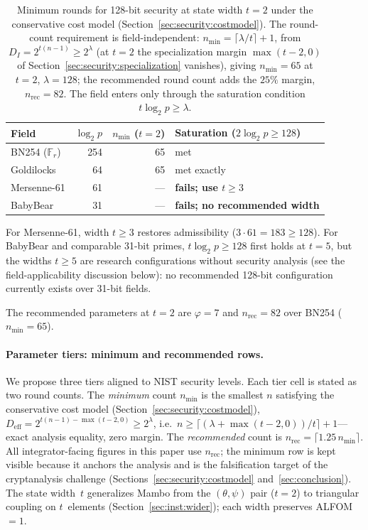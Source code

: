 \documentclass[11pt,a4paper]{article}
\theoremstyle{definition}
\newcommand{\F}{\mathbb{F}}
\begin{document}
\begin{table}[h]
\centering
\caption{Minimum rounds for 128-bit security at state width $t=2$
under the conservative cost model
(Section~\ref{sec:security:costmodel}). The round-count requirement
is field-independent: $n_{\min} = \lceil \lambda/t \rceil + 1$, from
$D_I = 2^{t(n-1)} \ge 2^{\lambda}$ (at $t = 2$ the specialization
margin $\max(t-2,0)$ of Section~\ref{sec:security:specialization}
vanishes), giving $n_{\min} = 65$ at
$t = 2$, $\lambda = 128$; the recommended round count adds the
$25\%$ margin, $n_{\mathrm{rec}} = 82$. The field enters only
through the saturation condition $t \log_2 p \ge \lambda$.}
\label{tab:nmin_t2}
\begin{tabular}{@{}lrrl@{}}
\toprule
Field & $\log_2 p$ & $n_{\min}$ ($t{=}2$) & Saturation ($2\log_2 p \ge 128$) \\
\midrule
BN254 ($\F_r$) & 254 & 65 & met \\
Goldilocks     &  64 & 65 & met exactly \\
Mersenne-61    &  61 & --- & \textbf{fails; use $t \ge 3$} \\
BabyBear       &  31 & --- & \textbf{fails; no recommended width} \\
\bottomrule
\end{tabular}
\smallskip

\footnotesize
For Mersenne-61, width $t \ge 3$ restores admissibility
($3 \cdot 61 = 183 \ge 128$). For BabyBear and comparable 31-bit
primes, $t \log_2 p \ge 128$ first holds at $t = 5$, but the widths
$t \ge 5$ are research configurations without security analysis (see
the field-applicability discussion below): no recommended 128-bit
configuration currently exists over 31-bit fields.
\end{table}

The recommended parameters at $t = 2$ are $\varphi = 7$ and
$n_{\mathrm{rec}} = 82$ over BN254 ($n_{\min} = 65$).

\paragraph{Parameter tiers: minimum and recommended rows.}
We propose three tiers aligned to NIST security levels. Each tier
cell is stated as two round counts. The \emph{minimum} count
$n_{\min}$ is the smallest $n$ satisfying the conservative cost model
(Section~\ref{sec:security:costmodel}),
$D_{\mathrm{eff}} = 2^{t(n-1)-\max(t-2,0)} \ge 2^{\lambda}$, i.e.\
$n \ge \lceil (\lambda + \max(t-2,0))/t \rceil + 1$---exact analysis
equality, zero margin. The \emph{recommended} count is
$n_{\mathrm{rec}} = \lceil 1.25\, n_{\min} \rceil$. All
integrator-facing figures in this paper use $n_{\mathrm{rec}}$; the
minimum row is kept visible because it anchors the analysis and is
the falsification target of the cryptanalysis challenge
(Sections~\ref{sec:security:costmodel} and~\ref{sec:conclusion}).
The state width~$t$ generalizes Mambo from the $(\theta, \psi)$ pair
($t=2$) to triangular coupling on $t$~elements
(Section~\ref{sec:inst:wider}); each width preserves ALFOM~$=1$.
\end{document}
